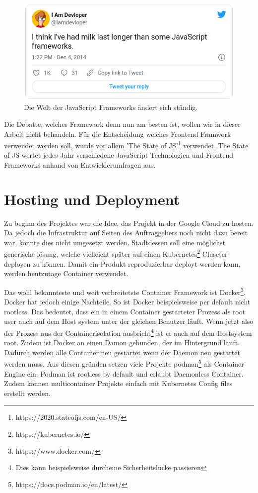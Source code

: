 \begin{figure}[htbp]
    \centering
    \includegraphics{gfx/js-milk}
    \caption{
        Die Welt der JavaScript Frameworks ändert sich ständig.\cite{twitter-js-state}
    }
    \label{fig:frontend-stack}
\end{figure}

Die Debatte, welches Framework denn nun am besten ist, wollen wir in dieser Arbeit nicht behandeln.
Für die Entscheidung welches Frontend Framwork verwendet werden soll, wurde vor allem 'The State of JS'\footnote{https://2020.stateofjs.com/en-US/}
verwendet. The State of JS wertet jedes Jahr verschiedene JavaScript Technologien und Frontend Frameworks
anhand von Entwicklerumfragen aus.\cite{state-of-js-2020-fwk}




\section{Hosting und Deployment}
\label{state:deployment}

Zu beginn des Projektes war die Idee, das Projekt in der Google Cloud zu hosten.
Da jedoch die Infrastruktur auf Seiten des Auftraggebers noch nicht dazu bereit
war, konnte dies nicht umgesetzt werden. Stadtdessen soll eine möglichst
generische lösung, welche vielleicht später auf einen Kubernetes\footnote{https://kubernetes.io/}
Cluseter deployen zu können. Damit ein Produkt reproduzierbar
deployt werden kann, werden heutzutage Container verwendet. \cite{what-is-a-container}

Das wohl bekannteste und weit verbreitetste Container Framework
ist Docker\footnote{https://www.docker.com/}. Docker hat jedoch einige Nachteile.
So ist Docker beispielsweise per default nicht rootless.\cite{docker:rootless}
Das bedeutet, dass ein in einem Container gestarteter Prozess als root user
auch auf dem Host system unter der gleichen Benutzer läuft. Wenn jetzt also
der Prozess aus der Containerisolation ausbricht\footnote{Dies kann beispielsweise durcheine Sicherheitslücke passieren}
ist er auch auf dem Hostsystem root.\cite{so_2020}
Zudem ist Docker an einen Damon gebunden, der im Hintergrund läuft.
Dadurch werden alle Container neu gestartet wenn der Daemon neu gestartet werden muss.\cite{docker:daemon}
Aus diesen gründen setzen viele Projekte podman\footnote{https://docs.podman.io/en/latest/}
als Container Engine ein. Podman ist rootless by default und erlaubt Daemonless Container.
Zudem können multicontainer Projekte einfach mit Kubernetes Config files
erstellt werden.\cite{redhat:podman-pods}